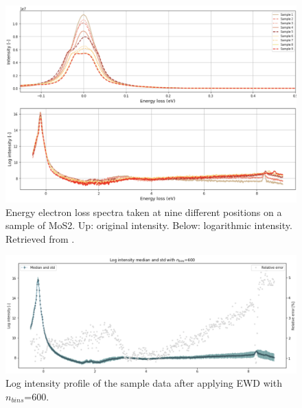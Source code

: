 \documentclass[11pt,a4paper]{article}
\numberwithin{equation}{section}
\numberwithin{figure}{section}
\numberwithin{table}{section}
\begin{document}
\begin{figure}[H]
    \centering
    \includegraphics[width=130mm]{plots/spectrum.png}
    \caption{Energy electron loss spectra taken at nine different positions on a sample of MoS2. Up: original intensity. Below: logarithmic intensity. Retrieved from \cite{soniamos2}. }
    \label{spectra}
\end{figure}


\begin{figure}[H]
    \centering
    \includegraphics[width=155mm]{plots/ewd.png}
    \caption{Log intensity profile of the sample data after applying EWD with $n_{bins}$=600.}
    \label{ranges}
\end{figure}



\end{document}
